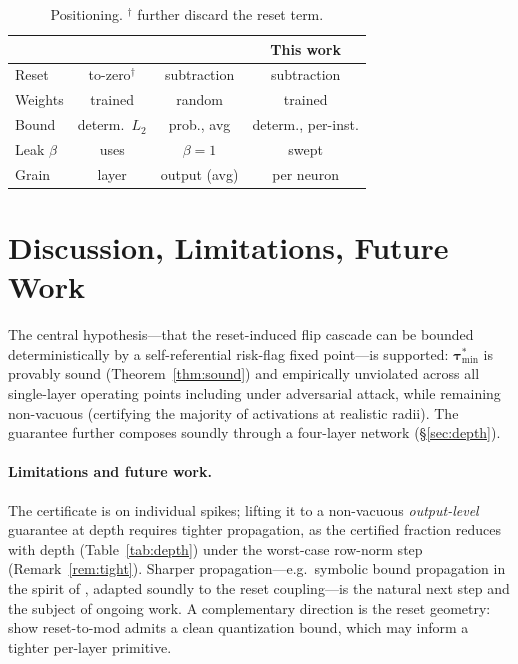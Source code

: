 \documentclass[10pt,twocolumn]{article}
\begin{document}
\begin{table}[t]
\centering\small
\renewcommand{\arraystretch}{1.18}
\begin{tabular}{@{}lccc@{}}
\toprule
 & \citet{ding2024robust} & \citet{araya2025random} & This work\\
\midrule
Reset      & to-zero$^\dagger$ & subtraction & subtraction\\
Weights    & trained & random & trained\\
Bound      & determ.\ $L_2$ & prob., avg & determ., per-inst.\\
Leak $\beta$& uses & $\beta{=}1$ & swept\\
Grain      & layer & output (avg) & per neuron\\
\bottomrule
\end{tabular}
\caption{Positioning. $^\dagger$ \citet{ding2024robust} further discard the reset term.}
\label{tab:pos}
\end{table}

\section{Discussion, Limitations, Future Work}
\label{sec:disc}

The central hypothesis---that the reset-induced flip cascade can be bounded deterministically by
a self-referential risk-flag fixed point---is supported: $\bm{\tau}^{*}_{\min}$ is provably sound
(Theorem~\ref{thm:sound}) and empirically unviolated across all single-layer operating points
including under adversarial attack, while remaining non-vacuous (certifying the majority of
activations at realistic radii). The guarantee further composes soundly through a four-layer
network (\S\ref{sec:depth}).

\paragraph{Limitations and future work.} The certificate is on individual spikes; lifting it to a
non-vacuous \emph{output-level} guarantee at depth requires tighter propagation, as the certified
fraction reduces with depth (Table~\ref{tab:depth}) under the worst-case row-norm step
(Remark~\ref{rem:tight}). Sharper propagation---e.g.\ symbolic bound propagation in the spirit of
\citet{zhang2018crown}, adapted soundly to the reset coupling---is the natural next step and the
subject of ongoing work. A complementary direction is the reset geometry: \citet{moser2024if}
show reset-to-mod admits a clean quantization bound, which may inform a tighter per-layer
primitive.
\end{document}

